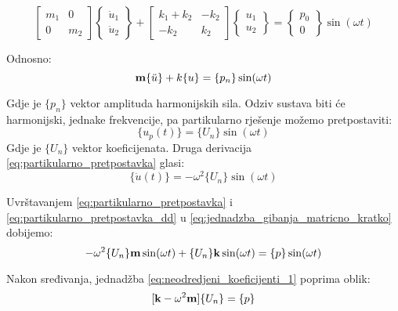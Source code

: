 \begin{equation}\label{eq:jednadzba_gibanja_matricno}
    \begin{bmatrix}
        m_1 & 0 \\
        0   & m_2
    \end{bmatrix}
    \begin{Bmatrix}
        \ddot{u}_1\\
        \ddot{u}_2
    \end{Bmatrix}
    +
    \begin{bmatrix}
        k_1+k_2 & -k_2\\
        -k_2 & k_2
    \end{bmatrix}
    \begin{Bmatrix}
        u_1\\
        u_2
    \end{Bmatrix}
    =
    \begin{Bmatrix}
        p_0\\
        0 
    \end{Bmatrix}
    \sin(\omega t)
\end{equation}

Odnosno:
\begin{equation}\label{eq:jednadzba_gibanja_matricno_kratko}
    \mathbf{m}\{\ddot{u}\}+k\{u\}=\{p_n\}\sin(\omega t)
\end{equation}

Gdje je $\{p_n\}$ vektor amplituda harmonijskih sila. Odziv sustava biti će
harmonijski, jednake frekvencije, pa partikularno rješenje možemo pretpostaviti:
\begin{equation}\label{eq:partikularno_pretpostavka}
    \{u_p(t)\}{}=\{U_n\}{}\sin(\omega t)
\end{equation}
Gdje je $\{U_n\}$ vektor koeficijenata.
Druga derivacija \eqref{eq:partikularno_pretpostavka} glasi:
\begin{equation}\label{eq:partikularno_pretpostavka_dd}
    \{\ddot{u}(t)\}=-\omega^2\{U_n\}\sin(\omega t)
\end{equation}

Uvrštavanjem \eqref{eq:partikularno_pretpostavka} i \eqref{eq:partikularno_pretpostavka_dd}
u \eqref{eq:jednadzba_gibanja_matricno_kratko} dobijemo:
\begin{equation}\label{eq:neodredjeni_koeficijenti_1}
    -\omega^2\{U_n\}\mathbf{m}\sin(\omega t) 
    +
    \{U_n\}\mathbf{k}\sin(\omega t)
    =
    \{p\}\sin(\omega t)
\end{equation}

Nakon sređivanja, jednadžba \eqref{eq:neodredjeni_koeficijenti_1} poprima oblik:
\begin{equation}\label{eq:neodredjeni_koeficijenti_2}
    [\mathbf{k}-\omega^2\mathbf{m}]\{U_n\}=\{p\}
\end{equation}

